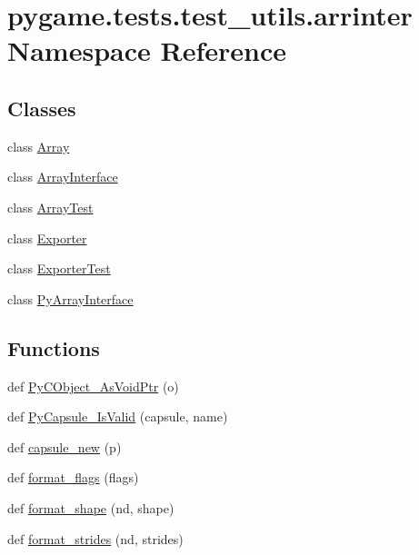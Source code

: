 \hypertarget{namespacepygame_1_1tests_1_1test__utils_1_1arrinter}{}\section{pygame.\+tests.\+test\+\_\+utils.\+arrinter Namespace Reference}
\label{namespacepygame_1_1tests_1_1test__utils_1_1arrinter}
\subsection*{Classes}
\begin{DoxyCompactItemize}
\item 
class \hyperlink{classpygame_1_1tests_1_1test__utils_1_1arrinter_1_1_array}{Array}
\item 
class \hyperlink{classpygame_1_1tests_1_1test__utils_1_1arrinter_1_1_array_interface}{Array\+Interface}
\item 
class \hyperlink{classpygame_1_1tests_1_1test__utils_1_1arrinter_1_1_array_test}{Array\+Test}
\item 
class \hyperlink{classpygame_1_1tests_1_1test__utils_1_1arrinter_1_1_exporter}{Exporter}
\item 
class \hyperlink{classpygame_1_1tests_1_1test__utils_1_1arrinter_1_1_exporter_test}{Exporter\+Test}
\item 
class \hyperlink{classpygame_1_1tests_1_1test__utils_1_1arrinter_1_1_py_array_interface}{Py\+Array\+Interface}
\end{DoxyCompactItemize}
\subsection*{Functions}
\begin{DoxyCompactItemize}
\item 
def \hyperlink{namespacepygame_1_1tests_1_1test__utils_1_1arrinter_a0f73c7a8779a07036caf7458b578552c}{Py\+C\+Object\+\_\+\+As\+Void\+Ptr} (o)
\item 
def \hyperlink{namespacepygame_1_1tests_1_1test__utils_1_1arrinter_a99a193be1ab23b5b00cf7809fb9b8d0f}{Py\+Capsule\+\_\+\+Is\+Valid} (capsule, name)
\item 
def \hyperlink{namespacepygame_1_1tests_1_1test__utils_1_1arrinter_a2bec215da96fb0d84940b3de32664e6d}{capsule\+\_\+new} (p)
\item 
def \hyperlink{namespacepygame_1_1tests_1_1test__utils_1_1arrinter_a5ba2a19a8103628aaaf5ca39e4443b34}{format\+\_\+flags} (flags)
\item 
def \hyperlink{namespacepygame_1_1tests_1_1test__utils_1_1arrinter_ad78a2c2a6c25f27c777ad5dbda37e8c8}{format\+\_\+shape} (nd, shape)
\item 
def \hyperlink{namespacepygame_1_1tests_1_1test__utils_1_1arrinter_a506c55400272eb40c8fa37f6bab030ae}{format\+\_\+strides} (nd, strides)
\end{DoxyCompactItemize}
